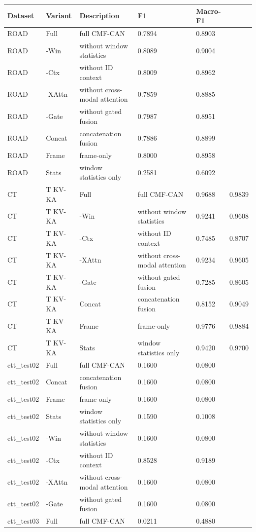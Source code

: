 \begin{tabular}{lllll}
\toprule
Dataset & Variant & Description & F1 & Macro-F1 \\
\midrule
ROAD & Full & full CMF-CAN & 0.7894 & 0.8903 \\
ROAD & -Win & without window statistics & 0.8089 & 0.9004 \\
ROAD & -Ctx & without ID context & 0.8009 & 0.8962 \\
ROAD & -XAttn & without cross-modal attention & 0.7859 & 0.8885 \\
ROAD & -Gate & without gated fusion & 0.7987 & 0.8951 \\
ROAD & Concat & concatenation fusion & 0.7886 & 0.8899 \\
ROAD & Frame & frame-only & 0.8000 & 0.8958 \\
ROAD & Stats & window statistics only & 0.2581 & 0.6092 \\
CT&T KV-KA & Full & full CMF-CAN & 0.9688 & 0.9839 \\
CT&T KV-KA & -Win & without window statistics & 0.9241 & 0.9608 \\
CT&T KV-KA & -Ctx & without ID context & 0.7485 & 0.8707 \\
CT&T KV-KA & -XAttn & without cross-modal attention & 0.9234 & 0.9605 \\
CT&T KV-KA & -Gate & without gated fusion & 0.7285 & 0.8605 \\
CT&T KV-KA & Concat & concatenation fusion & 0.8152 & 0.9049 \\
CT&T KV-KA & Frame & frame-only & 0.9776 & 0.9884 \\
CT&T KV-KA & Stats & window statistics only & 0.9420 & 0.9700 \\
ctt_test02 & Full & full CMF-CAN & 0.1600 & 0.0800 \\
ctt_test02 & Concat & concatenation fusion & 0.1600 & 0.0800 \\
ctt_test02 & Frame & frame-only & 0.1600 & 0.0800 \\
ctt_test02 & Stats & window statistics only & 0.1590 & 0.1008 \\
ctt_test02 & -Win & without window statistics & 0.1600 & 0.0800 \\
ctt_test02 & -Ctx & without ID context & 0.8528 & 0.9189 \\
ctt_test02 & -XAttn & without cross-modal attention & 0.1600 & 0.0800 \\
ctt_test02 & -Gate & without gated fusion & 0.1600 & 0.0800 \\
ctt_test03 & Full & full CMF-CAN & 0.0211 & 0.4880 \\

\end{tabular}
